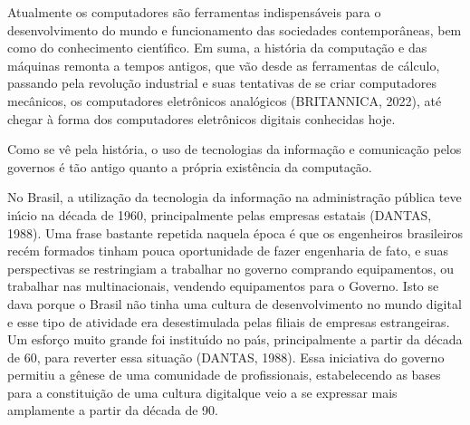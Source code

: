 \documentclass[
12pt,		%
openright,	%
twoside,  %
a4paper,			%
chapter=TITLE,		%
english,			%
french,				%
spanish,			%
brazil				%
]{USPSC-classe/USPSC}
\begin{document}
Atualmente os computadores s\~ao ferramentas indispens\'aveis para o desenvolvimento do mundo e funcionamento das sociedades contempor\^aneas, bem como do conhecimento cient\'{\i}fico. Em suma, a hist\'oria da computa\c{c}\~ao e das m\'aquinas remonta a tempos antigos, que v\~ao desde as ferramentas de c\'alculo, passando pela revolu\c{c}\~ao industrial e suas tentativas de se criar computadores mec\^anicos, os computadores eletr\^onicos anal\'ogicos  (BRITANNICA, 2022), at\'e chegar \`a forma dos computadores eletr\^onicos digitais conhecidas hoje.

















Como se v\^e pela hist\'oria, o uso de tecnologias da informa\c{c}\~ao e comunica\c{c}\~ao pelos governos \'e t\~ao antigo quanto a pr\'opria exist\^encia da computa\c{c}\~ao.

















No Brasil, a utiliza\c{c}\~ao da tecnologia da informa\c{c}\~ao na administra\c{c}\~ao p\'ublica teve in\'{\i}cio na d\'ecada de 1960, principalmente pelas empresas estatais  (DANTAS, 1988). Uma frase bastante repetida naquela \'epoca \'e que os engenheiros brasileiros rec\'em formados tinham pouca oportunidade de fazer engenharia de fato, e suas perspectivas se restringiam a trabalhar no governo comprando equipamentos, ou trabalhar nas multinacionais, vendendo equipamentos para o Governo. Isto se dava porque o Brasil n\~ao tinha uma cultura de desenvolvimento no mundo digital e esse tipo de atividade era desestimulada pelas filiais de empresas estrangeiras. Um esfor\c{c}o muito grande foi institu\'{\i}do no pa\'{\i}s, principalmente a partir da d\'ecada de 60, para reverter essa situa\c{c}\~ao  (DANTAS, 1988). Essa iniciativa do governo permitiu a g\^enese de uma comunidade de profissionais, estabelecendo as bases para a constitui\c{c}\~ao de uma \textquotedbl cultura digital\textquotedbl  que veio a se expressar mais amplamente a partir da d\'ecada de 90.
\end{document}
